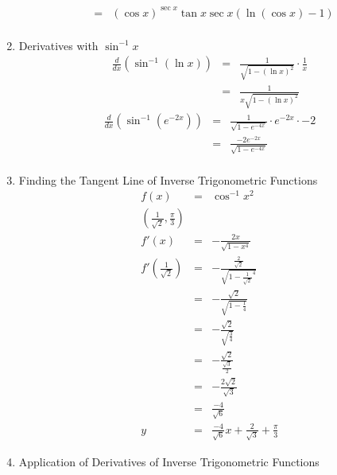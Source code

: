 \documentclass{article}
\begin{document}
\begin{enumerate}
\begin{eqnarray}
              &=& \left(\cos{x}\right)^{\sec{x}}\tan{x}\sec{x}\left(\ln{\left(\cos{x}\right)} - 1\right) \\
    \end{eqnarray}
    \item Derivatives with $\sin^{-1}{x}$
    \begin{eqnarray}
        \frac{d}{dx} \left(\sin^{-1}{\left(\ln{x}\right)}\right) &=& \frac{1}{\sqrt{1 - \left(\ln{x}\right)^2}} \cdot \frac{1}{x} \\
                                                                 &=& \frac{1}{x\sqrt{1 - \left(\ln{x}\right)^2}}
    \end{eqnarray}
    \begin{eqnarray}
        \frac{d}{dx}\left(\sin^{-1}{\left(e^{-2x}\right)}\right) &=& \frac{1}{\sqrt{1 - e^{-4x}}} \cdot e^{-2x} \cdot -2 \\
                                                                 &=& \frac{-2e^{-2x}}{\sqrt{1 - e^{-4x}}} \\
    \end{eqnarray}
    \item Finding the Tangent Line of Inverse Trigonometric Functions
    \begin{eqnarray}
        f(x) &=& \cos^{-1}{x^2} \\
        \left(\frac{1}{\sqrt{2}}, \frac{\pi}{3}\right) \\
        f'(x) &=& -\frac{2x}{\sqrt{1 - x^4}} \\
        f'\left(\frac{1}{\sqrt{2}}\right) &=& -\frac{\frac{2}{\sqrt{2}}}{\sqrt{1 - \frac{1}{\sqrt{2}}^4}} \\
                                          &=& -\frac{\sqrt{2}}{\sqrt{1 - \frac{1}{4}}} \\
                                          &=& -\frac{\sqrt{2}}{\sqrt{\frac{3}{4}}} \\
                                          &=& -\frac{\sqrt{2}}{\frac{\sqrt{3}}{2}} \\
                                          &=& -\frac{2\sqrt{2}}{\sqrt{3}} \\
                                          &=& \frac{-4}{\sqrt{6}} \\
        y &=& \frac{-4}{\sqrt{6}}x + \frac{2}{\sqrt{3}} + \frac{\pi}{3}
    \end{eqnarray}
    \item Application of Derivatives of Inverse Trigonometric Functions
    \begin{eqnarray}

\end{eqnarray}
\end{enumerate}
\end{document}

